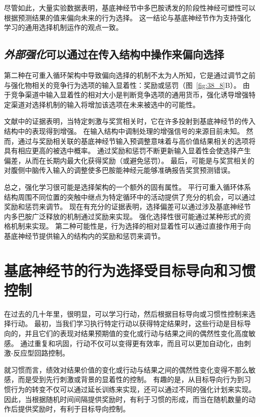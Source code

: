 尽管如此，大量实验数据表明，基底神经节中多巴胺诱发的阶段性神经可塑性可以根据预测结果的值来偏向未来的行为选择。
这一结论与基底神经节作为支持强化学习的通用选择机制运作的观点一致。



\subsection{\textit{外部强化}可以通过在传入结构中操作来偏向选择}

第二种在可重入循环架构中导致偏向选择的机制不太为人所知，它是通过调节之前与强化物相关的竞争行为选项的输入显着性：奖励或惩罚（图~\ref{fig:38_8}B）。
由于竞争渠道中输入显着性的相对大小是判断竞争选项的通用货币，强化诱导增强特定渠道对选择机制的输入将增加该选项在未来被选中的可能性。


文献中的证据表明，当特定刺激与奖赏相关时，它在许多投射到基底神经节的传入结构中的表现得到增强。
在输入结构中调制处理的增强信号的来源目前未知。
然而，通过与奖励相关联的基底神经节输入预调整意味着与高价值结果相关的选项将具有相应更高的被选中概率。
通过奖励和惩罚不断更新输入显着性会使选择产生偏差，从而在长期内最大化获得奖励（或避免惩罚）。
最后，可能是与奖赏相关的对腹侧中脑传入输入的调整使多巴胺能神经元能够准确报告奖赏预测错误。


总之，强化学习很可能是选择架构的一个额外的固有属性。
平行可重入循环体系结构周围不同位置的突触中继点为特定循环中的活动提供了充分的机会，可以通过奖励和惩罚来调节。
现在有充分的证据表明，选择偏差可以通过涉及基底神经节内多巴胺广泛释放的机制通过奖励来实现。
强化选择性很可能通过某种形式的资格机制来实现。
第二种可能性是，行为选择的相对显着性可以通过直接作用于向基底神经节提供输入的结构内的奖励和惩罚来调节。



\section{基底神经节的行为选择受目标导向和习惯控制}

在过去的几十年里，很明显，可以学习行动，然后根据目标导向或习惯性控制来选择行动。
最初，当我们学习执行特定行动以获得特定结果时，这些行动是目标导向的，并且它们的表现对结果预期值的变化或行动与结果之间的偶然性变化高度敏感。
通过重复和巩固，行动不仅可以变得更有效率，而且可以更加自动化，由刺激-反应型回路控制。


就习惯而言，绩效对结果价值的变化或行动与结果之间的偶然性变化变得不那么敏感，而是受到先行刺激或背景的显着性的控制。
有趣的是，从目标导向行为到习惯行为的转变不仅可以通过延长训练来实现，还可以通过不同的强化计划来实现。
因此，当根据随机时间间隔提供奖励时，有利于习惯的形成，而当在随机数量的动作后提供奖励时，有利于目标导向控制。


